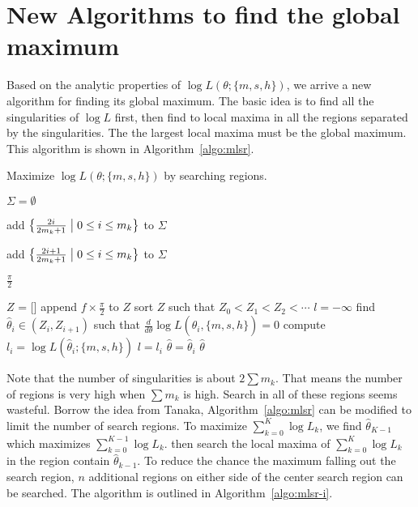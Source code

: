 \documentclass{article}
\begin{document}
\section{New Algorithms to find the global maximum}
Based on the analytic properties of $\log L(\theta; \{m,s,h\})$,
we arrive a new algorithm for finding its global maximum.  The
basic idea is to find all the singularities of $\log L$ first, then
find to local maxima in all the regions separated by the
singularities.  The the largest local maxima must be the global maximum.
This algorithm is shown in Algorithm~\ref{algo:mlsr}.

\begin{algorithm}
  \caption{Maximize $\log L(\theta; \{m, s, h\})$
    by searching regions.}
  \label{algo:mlsr}
  \begin{algorithmic}[1]

    \State $\Sigma = \emptyset$


    \State add $\bigl\{\frac{2i}{2m_k+1} \bigm| 0 \le i \le m_k\bigr\}$ to $\Sigma$
    \EndIf

    \State add $\bigl\{\frac{2i+1}{2m_k+1} \bigm| 0\le i \le m_k\bigr\}$ to $\Sigma$
    \EndIf

    \EndFor

    \If{$0\not\in\Sigma$}
    \EndIf

    \If{$1\not\in\Sigma$}
    \Return $\frac\pi2$
    \EndIf
    

    \State $Z$ = []
    \State append $f\times\frac\pi2$ to $Z$
    \EndFor
    \State sort $Z$ such that $Z_0 < Z_1 < Z_2 < \cdots$
    \State $l = -\infty$
    \State find $\hat\theta_i\in(Z_i, Z_{i+1})$ such that
    $\frac{d}{d\theta}\log L(\hat\theta_i, \{m,s,h\}) = 0$
    \State compute $l_i = \log L(\hat\theta_i; \{m, s, h\})$
    \State $l = l_i$
    \State $\hat\theta = \hat\theta_i$
    \EndIf
    \EndFor
    \Return $\hat\theta$
    \EndProcedure
  \end{algorithmic}
\end{algorithm}


Note that the number of singularities is about $2\sum m_k$.
That means the number of regions is very high when $\sum m_k$ is high.
Search in all of these regions seems wasteful.  Borrow the
idea from Tanaka\cite{qiskit_aewoqft}, Algorithm~\ref{algo:mlsr} can
be modified to limit the number of search regions.  To maximize
$\sum_{k=0}^K \log L_k$, we find $\hat\theta_{K-1}$ which maximizes
$\sum_{k=0}^{K-1}\log L_k$.  then search the local maxima of
$\sum_{k=0}^K\log L_k$ in the region contain $\hat\theta_{k-1}$.  To
reduce the chance the maximum falling out the search region,
$n$ additional regions on either side of the center search region
can be searched.  The algorithm is outlined in Algorithm~\ref{algo:mlsr-i}.
\end{document}

